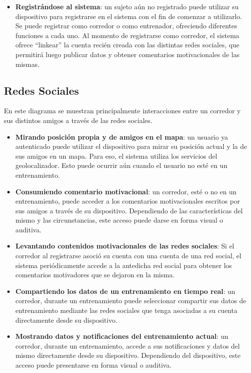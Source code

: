 
\begin{itemize}
	\item \textbf{Registrándose al sistema}: un sujeto aún no registrado puede utilizar su dispositivo para registrarse en el sistema con el fin de comenzar a utilizarlo. Se puede registrar como corredor o como entrenador, ofreciendo diferentes funciones a cada uno. Al momento de registrarse como corredor, el sistema ofrece ``linkear'' la cuenta recién creada con las distintas redes sociales, que permitirá luego publicar datos y obtener comentarios motivacionales de las mismas.
\end{itemize}


\subsection{Redes Sociales}
En este diagrama se muestran principalmente interacciones entre un corredor y sus distintos amigos a través de las redes sociales.


\begin{itemize}
	\item \textbf{Mirando posición propia y de amigos en el mapa}: un usuario ya autenticado puede utilizar el dispositivo para mirar su posición actual y la de sus amigos en un mapa. Para eso, el sistema utiliza los servicios del geolocalizador. Esto puede ocurrir aún cuando el usuario no esté en un entrenamiento.
	\item \textbf{Consumiendo comentario motivacional}: un corredor, esté o no en un entrenamiento, puede acceder a los comentarios motivacionales escritos por sus amigos a través de su dispositivo. Dependiendo de las características del mismo y las circunstancias, este acceso puede darse en forma visual o auditiva.
	\item \textbf{Levantando contenidos motivacionales de las redes sociales}: Si el corredor al registrarse asoció su cuenta con una cuenta de una red social, el sistema periódicamente accede a la antedicha red social para obtener los comentarios motivadores que se dejaron en la misma. 
	\item \textbf{Compartiendo los datos de un entrenamiento en tiempo real}: un corredor, durante un entrenamiento puede seleccionar compartir sus datos de entrenamiento mediante las redes sociales que tenga asociadas a su cuenta directamente desde su dispositivo.
	\item \textbf{Mostrando datos y notificaciones del entrenamiento actual}: un corredor, durante un entrenamiento, accede a sus notificaciones y datos del mismo directamente desde su dispositivo. Dependiendo del dispositivo, este acceso puede presentarse en forma visual o auditiva.
\end{itemize}


